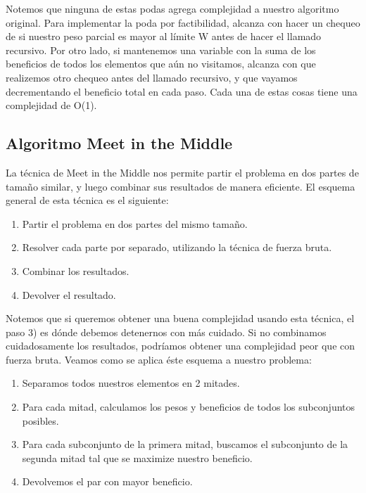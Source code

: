 Notemos que ninguna de estas podas agrega complejidad a nuestro algoritmo original. Para implementar la poda por factibilidad, alcanza con hacer un chequeo de si nuestro peso parcial es mayor al límite W antes de hacer el llamado recursivo. Por otro lado, si mantenemos una variable con la suma de los beneficios de todos los elementos que aún no visitamos, alcanza con que realizemos otro chequeo antes del llamado recursivo, y que vayamos decrementando el beneficio total en cada paso. Cada una de estas cosas tiene una complejidad de O(1).


\subsection{Algoritmo Meet in the Middle}

La técnica de Meet in the Middle nos permite partir el problema en dos partes de tamaño similar, y luego combinar sus resultados de manera eficiente.
El esquema general de esta técnica es el siguiente:

\begin{enumerate}
\item Partir el problema en dos partes del mismo tamaño.
\item Resolver cada parte por separado, utilizando la técnica de fuerza bruta.
\item Combinar los resultados.
\item Devolver el resultado.
\end{enumerate}

Notemos que si queremos obtener una buena complejidad usando esta técnica, el paso 3) es dónde debemos detenernos con más cuidado. Si no combinamos cuidadosamente los resultados, podríamos obtener una complejidad peor que con fuerza bruta.
Veamos como se aplica éste esquema a nuestro problema:

\begin{enumerate}
\item Separamos todos nuestros elementos en 2 mitades.
\item Para cada mitad, calculamos los pesos y beneficios de todos los subconjuntos posibles.
\item Para cada subconjunto de la primera mitad, buscamos el subconjunto de la segunda mitad tal que se maximize nuestro beneficio.
\item Devolvemos el par con mayor beneficio.
\end{enumerate}

